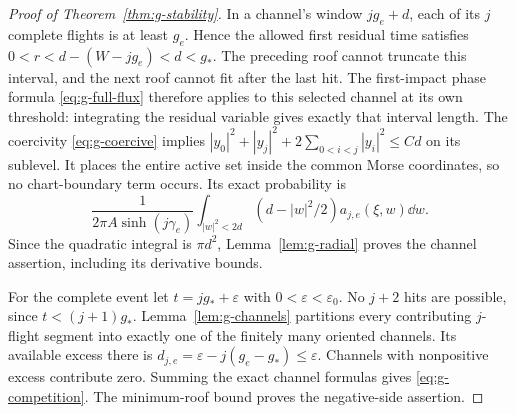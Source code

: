 \begin{proof}[Proof of Theorem~\ref{thm:g-stability}]
In a channel's window $jg_e+d$, each of its $j$ complete flights is at
least $g_e$. Hence the allowed first residual time satisfies
$0<r<d-(W-jg_e)<d<g_*$. The preceding roof cannot truncate this interval,
and the next roof cannot fit after the last hit. The first-impact phase formula \eqref{eq:g-full-flux} therefore
applies to this selected channel at its own threshold: integrating
the residual variable gives exactly that interval length.
The coercivity \eqref{eq:g-coercive} implies
$|y_0|^2+|y_j|^2+2\sum_{0<i<j}|y_i|^2\le Cd$ on its sublevel.
It places the entire active set inside the common Morse coordinates,
so no chart-boundary term occurs. Its exact probability is
\[
 \frac1{2\pi A\sinh(j\gamma_e)}
 \int_{|w|^2<2d}(d-|w|^2/2)a_{j,e}(\xi,w)\dd w.
\]
Since the quadratic integral is $\pi d^2$, Lemma~\ref{lem:g-radial}
proves the channel assertion, including its derivative bounds.

For the complete event let $t=jg_*+\varepsilon$ with
$0<\varepsilon<\varepsilon_0$. No $j+2$ hits are possible, since
$t<(j+1)g_*$. Lemma~\ref{lem:g-channels} partitions every contributing
$j$-flight segment into exactly one of the finitely many oriented channels.
Its available excess there is $d_{j,e}=\varepsilon-j(g_e-g_*)\le
\varepsilon$. Channels with nonpositive excess contribute zero.
Summing the exact channel formulas gives \eqref{eq:g-competition}.
The minimum-roof bound proves the negative-side assertion.
\end{proof}

